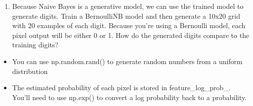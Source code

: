 \documentclass[11pt]{article}
\providecommand{\tightlist}{%
      \setlength{\itemsep}{0pt}\setlength{\parskip}{0pt}}
\begin{document}
    \begin{enumerate}
\def\labelenumi{(\arabic{enumi})}
\setcounter{enumi}{9}
\tightlist
\item
  Because Naive Bayes is a generative model, we can use the trained
  model to generate digits. Train a BernoulliNB model and then generate
  a 10x20 grid with 20 examples of each digit. Because you're using a
  Bernoulli model, each pixel output will be either 0 or 1. How do the
  generated digits compare to the training digits?
\end{enumerate}

\begin{itemize}
\tightlist
\item
  You can use np.random.rand() to generate random numbers from a uniform
  distribution
\item
  The estimated probability of each pixel is stored in
  feature\_log\_prob\_. You'll need to use np.exp() to convert a log
  probability back to a probability.
\end{itemize}
\end{document}
